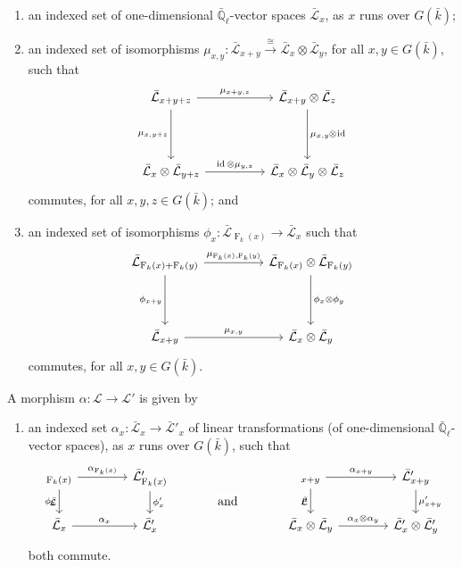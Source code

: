 \documentclass[11pt]{amsart}
\makeatletter
\theoremstyle{plain}
\theoremstyle{definition}
\theoremstyle{remark}
\newcommand{\EE}{\mathbb{\bar Q}_\ell}
\newcommand{\bFq}{\bar{k}}
\newcommand{\Fq}{k}
\newcommand{\Frob}[1]{{\operatorname{F}_{#1}}}
\DeclareMathOperator{\id}{id}
\newcommand{\iso}{{\ \cong\ }}
\newcommand{\cs}[1]{{\mathcal{#1}}}
\newcommand{\gcs}[1]{{\mathcal{\bar #1}}}
\newcommand{\labitem}[2]{%
\def\@itemlabel{\textbf{#1}}
\item
\def\@currentlabel{#1}\label{#2}}
\newcommand{\tight}[3]{\hspace{-#1pt}{#2}\hspace{-#3pt}}
\makeatother
\begin{document}
\begin{enumerate}
 \labitem{(cs.0)}{cs.0} an indexed set of one-dimensional
  $\EE$-vector spaces $\gcs{L}_x$, as $x$ runs over
  $G(\bFq)$;

 \labitem{(cs.1)}{cs.1} an indexed set of isomorphisms
  $\mu_{x,y} : \gcs{L}_{x+y} \mathop{\longrightarrow}\limits^{\iso} \gcs{L}_{x} \otimes \gcs{L}_{y}$,
  for all $x,y \in G(\bFq)$, such that
  \[
   \begin{tikzcd}[row sep=40]
    \gcs{L}_{x+y+z} \arrow{rr}{\mu_{x+y,z}} \arrow[swap]{d}{\mu_{x,y+z}}
    && \gcs{L}_{x+y}\otimes \gcs{L}_{z} \dar{\mu_{x,y} \tight{0.5}{\otimes}{1} \id} \\
    \gcs{L}_{x} \otimes \gcs{L}_{y+z} \arrow{rr}{\id \otimes \mu_{y,z}}
    && \gcs{L}_{x} \otimes\gcs{L}_{y} \otimes \gcs{L}_{z}
   \end{tikzcd}
  \]
  commutes, for all $x,y,z\in G(\bFq)$; and

 \labitem{(cs.2)}{cs.2} an indexed set of isomorphisms $\phi_{x} : \gcs{L}_{\Frob{\Fq}(x)} \to \gcs{L}_x$
  such that
  \[
   \begin{tikzcd}[row sep=40]
    \gcs{L}_{\Frob{\Fq}(x)+\Frob{\Fq}(y)} \arrow[swap]{d}{\phi_{x+y}} \arrow{rr}{\mu_{\Frob{\Fq}(x),\Frob{\Fq}(y)}}
    && \gcs{L}_{\Frob{\Fq}(x)}\otimes \gcs{L}_{\Frob{\Fq}(y)} \dar{\phi_x \tight{0}{\otimes}{0} \phi_y} \\
    \gcs{L}_{x+y} \arrow{rr}{\mu_{x,y}}
    && \gcs{L}_x \otimes\gcs{L}_y
   \end{tikzcd}
  \]
  commutes, for all $x,y\in G(\bFq)$.
\end{enumerate}

A morphism $\alpha : \cs{L} \to \cs{L'}$ is given by 
\begin{enumerate}
 \labitem{(cs.3)}{cs.3} an indexed set $\alpha_x : \gcs{L}_x \to \gcs{L'}_x$
  of linear transformations (of one-dimensional $\EE$-vector spaces),
  as $x$ runs over $G(\bFq)$, such that
  \[
   \begin{tikzcd}[column sep=40]
    \arrow[swap]{d}{\phi_x} \gcs{L}_{\Frob{\Fq}(x)} \rar{\alpha_{\Frob{\Fq}(x)}} & \gcs{L'}_{\Frob{\Fq}(x)} \dar{\phi_x'}
    &\arrow[draw=none]{d}[pos=.4,description]{\text{\normalsize{and}}}& \arrow[swap]{d}{\mu} \gcs{L}_{x+y} \rar{\alpha_{x+y}} & \gcs{L'}_{x+y} \dar{\mu'_{x+y}} \\
    \gcs{L}_x \rar{\alpha_x} & \gcs{L'}_x
    & {} & \gcs{L}_x\otimes\gcs{L}_y \rar{\alpha_x\otimes \alpha_y} & \gcs{L'}_x \otimes \gcs{L'}_y
   \end{tikzcd}
  \]
  both commute.
\end{enumerate}
\end{document}
